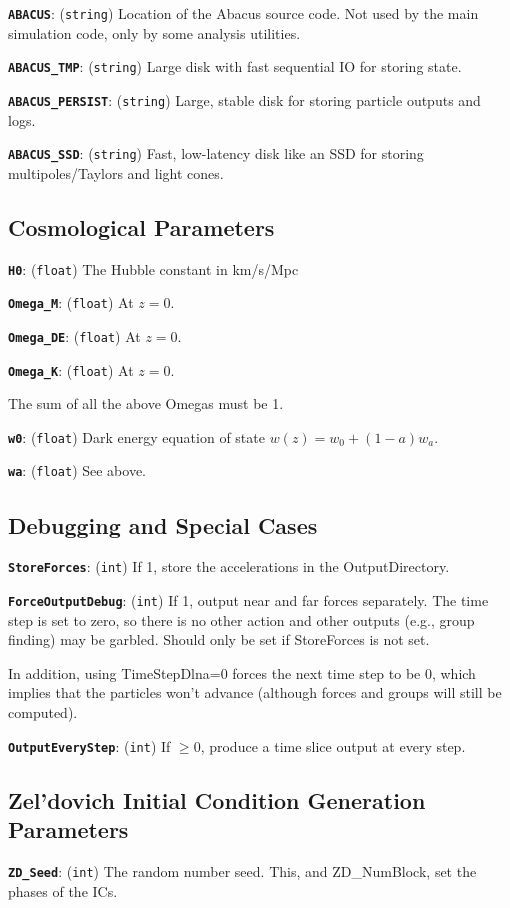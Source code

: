 \documentclass[11pt,preprint]{aastex}
\newcommand{\param}[2]{\medskip\noindent\textbf{\texttt{#1}}: ({\tt #2}) }
\begin{document}
\param{ABACUS}{string} Location of the Abacus source code. Not used by the main simulation code, only by some analysis utilities.

\param{ABACUS\_TMP}{string} Large disk with fast sequential IO for storing state.

\param{ABACUS\_PERSIST}{string} Large, stable disk for storing particle outputs and logs.

\param{ABACUS\_SSD}{string}  Fast, low-latency disk like an SSD for storing multipoles/Taylors and light cones.


\subsection{Cosmological Parameters}

\param{H0}{float} The Hubble constant in km/s/Mpc

\param{Omega\_M}{float} At $z=0$.

\param{Omega\_DE}{float} At $z=0$.

\param{Omega\_K}{float} At $z=0$.

The sum of all the above Omegas must be 1.

\param{w0}{float} Dark energy equation of state $w(z) = w_0 + (1-a)w_a$.

\param{wa}{float} See above.


\subsection{Debugging and Special Cases}\label{sec:special_params}

\param{StoreForces}{int} If 1, store the accelerations in the OutputDirectory.

\param{ForceOutputDebug}{int} If 1, output near and far forces
separately.  The time step is set to zero, so there is no other
action and other outputs (e.g., group finding) may be garbled.
Should only be set if StoreForces is not set.

In addition, using TimeStepDlna=0 forces the next time step to be 0, which
implies that the particles won't advance (although forces and groups
will still be computed).

\param{OutputEveryStep}{int} If $\ge 0$, produce a time slice output at every step.

\subsection{Zel'dovich Initial Condition Generation Parameters}
\param{ZD\_Seed}{int} The random number seed.  This, and ZD\_NumBlock, set the phases of the ICs.
\end{document}
